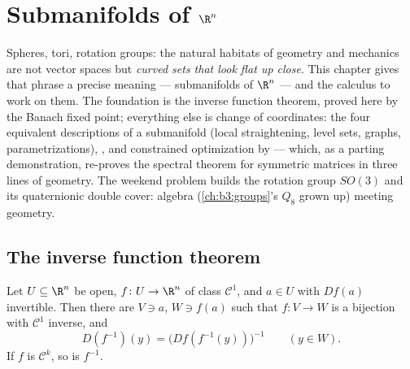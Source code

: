 \chapter{Submanifolds of \texorpdfstring{$\R^n$}{Rn}}
\label{ch:b3:submanifolds}

Spheres, tori, rotation groups: the natural habitats of
geometry and mechanics are not vector spaces but \emph{curved
sets that look flat up close}. This chapter gives that phrase
a precise meaning --- submanifolds of $\R^n$ --- and the
calculus to work on them. The foundation is the inverse
function theorem, proved here by the Banach fixed point;
everything else is change of coordinates: the four equivalent
descriptions of a submanifold (local straightening, level
sets, graphs, parametrizations), , and
constrained optimization by  --- which,
as a parting demonstration, re-proves the spectral theorem
for symmetric matrices in three lines of geometry. The
weekend problem builds the rotation group $SO(3)$ and its
quaternionic double cover: algebra (\cref{ch:b3:groups}'s
$Q_8$ grown up) meeting geometry.

\section{The inverse function theorem}

\begin{theorem}
\label{thm:b3:submanifolds:ift}
Let $U \subseteq \R^n$ be open, $f \colon U \to \R^n$ of
class $\mathcal C^1$, and $a \in U$ with $Df(a)$ invertible.
Then there are  $V \ni a$, $W \ni f(a)$ such that
$f \colon V \to W$ is a bijection with $\mathcal C^1$ inverse,
and
\[
D(f^{-1})(y) = \bigl(Df(f^{-1}(y))\bigr)^{-1}
\qquad (y \in W).
\]
If $f$ is $\mathcal C^k$, so is $f^{-1}$.
\end{theorem}

